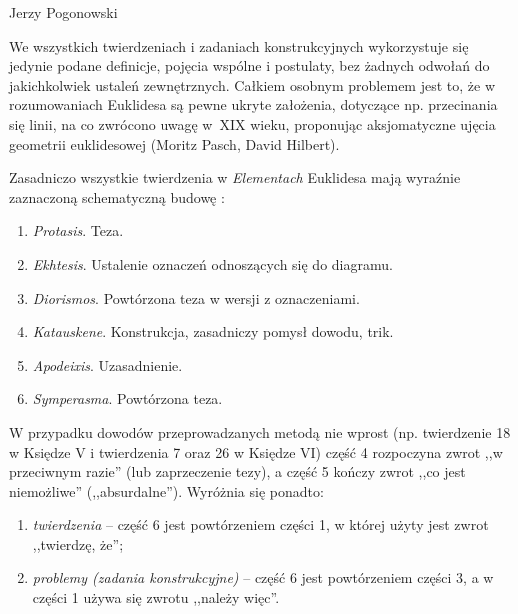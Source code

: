 \begin{newrevengenv}{Jerzy Pogonowski}
\begin{enumerate}
\end{enumerate}

We wszystkich twierdzeniach i zadaniach konstrukcyjnych
wykorzystuje się jedynie podane definicje, pojęcia wspólne i
postulaty, bez żadnych odwołań do jakichkolwiek ustaleń
zewnętrznych. Całkiem osobnym problemem jest to, że w
rozumowaniach Euklidesa są pewne ukryte założenia, dotyczące np.
przecinania się linii, na co zwrócono uwagę w~XIX wieku,
proponując aksjomatyczne ujęcia geometrii euklidesowej (Moritz
Pasch, David Hilbert).

Zasadniczo wszystkie twierdzenia w {\em Elementach} Euklidesa mają
wyraźnie zaznaczoną schematyczną budowę \parencite[s. 122--123]{euklides_elementy_2013}:

\begin{enumerate}

\item {\em Protasis}. Teza.

\item {\em Ekhtesis}. Ustalenie oznaczeń odnoszących się do
diagramu.

\item {\em Diorismos}. Powtórzona teza w wersji z oznaczeniami.

\item {\em Katauskene}. Konstrukcja, zasadniczy pomysł dowodu,
trik.

\item {\em Apodeixis}. Uzasadnienie.

\item {\em Symperasma}. Powtórzona teza.

\end{enumerate}

W przypadku dowodów przeprowadzanych metodą nie wprost (np.
twierdzenie 18 w Księdze V i twierdzenia 7 oraz 26 w Księdze VI)
część 4 rozpoczyna zwrot ,,w przeciwnym razie'' (lub zaprzeczenie
tezy), a część 5 kończy zwrot ,,co jest niemożliwe''
(,,absurdalne''). Wyróżnia się ponadto:

\begin{enumerate}

\item {\em twierdzenia} -- część 6 jest powtórzeniem części 1, w
której użyty jest zwrot ,,twierdzę, że'';

\item {\em problemy (zadania konstrukcyjne)} -- część 6 jest
powtórzeniem części 3, a w części 1 używa się zwrotu ,,należy
więc''.

\end{enumerate}


\end{newrevengenv}

